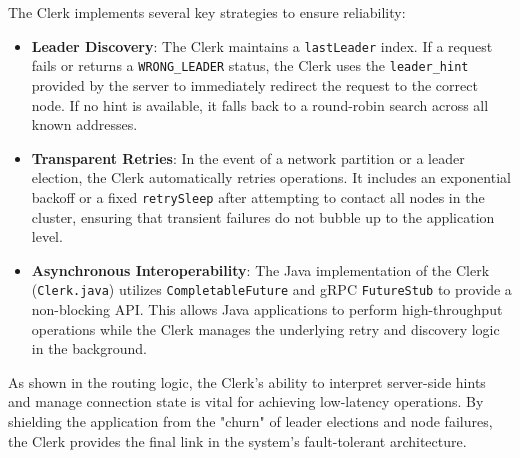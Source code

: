 The Clerk implements several key strategies to ensure reliability:
\begin{itemize}
    \item \textbf{Leader Discovery}: The Clerk maintains a \texttt{lastLeader} index. If a request fails or returns a \texttt{WRONG\_LEADER} status, the Clerk uses the \texttt{leader\_hint} provided by the server to immediately redirect the request to the correct node. If no hint is available, it falls back to a round-robin search across all known addresses.
    \item \textbf{Transparent Retries}: In the event of a network partition or a leader election, the Clerk automatically retries operations. It includes an exponential backoff or a fixed \texttt{retrySleep} after attempting to contact all nodes in the cluster, ensuring that transient failures do not bubble up to the application level.
    \item \textbf{Asynchronous Interoperability}: The Java implementation of the Clerk (\texttt{Clerk.java}) utilizes \texttt{CompletableFuture} and gRPC \texttt{FutureStub} to provide a non-blocking API. This allows Java applications to perform high-throughput operations while the Clerk manages the underlying retry and discovery logic in the background.
\end{itemize}


As shown in the routing logic, the Clerk's ability to interpret server-side hints and manage connection state is vital for achieving low-latency operations. By shielding the application from the "churn" of leader elections and node failures, the Clerk provides the final link in the system's fault-tolerant architecture.